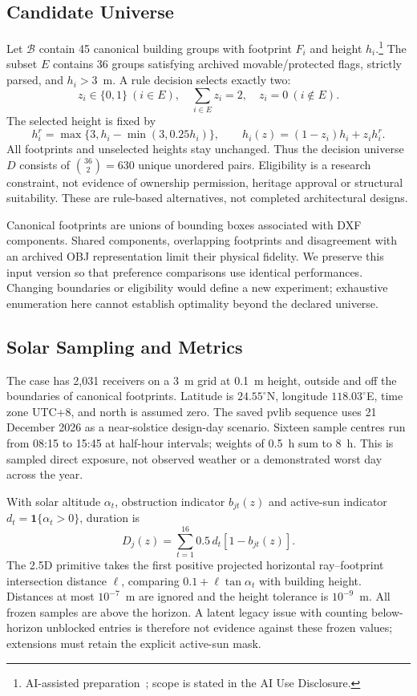 \documentclass{llncs}
\newcommand{\ind}{\mathbf{1}}
\newcommand{\aidraft}{\footnote{AI-assisted preparation~\cite{openai2026}; scope is stated in the AI Use Disclosure.}}
\begin{document}
\subsection{Candidate Universe}
Let $\mathcal B$ contain 45 canonical building groups with footprint $F_i$ and height $h_i$.\aidraft{} The subset $E$ contains 36 groups satisfying archived movable/protected flags, strictly parsed, and $h_i>3$~m. A rule decision selects exactly two:
\begin{equation}
 z_i\in\{0,1\}\ (i\in E),\quad \sum_{i\in E}z_i=2,\quad z_i=0\ (i\notin E).
\label{eq:feasible}
\end{equation}
The selected height is fixed by
\begin{equation}
 h_i^r=\max\{3,h_i-\min(3,0.25h_i)\},\qquad
 h_i(z)=(1-z_i)h_i+z_i h_i^r.
\label{eq:height}
\end{equation}
All footprints and unselected heights stay unchanged. Thus the decision universe $D$ consists of $\binom{36}{2}=630$ unique unordered pairs. Eligibility is a research constraint, not evidence of ownership permission, heritage approval or structural suitability. These are rule-based alternatives, not completed architectural designs.

Canonical footprints are unions of bounding boxes associated with DXF components. Shared components, overlapping footprints and disagreement with an archived OBJ representation limit their physical fidelity. We preserve this input version so that preference comparisons use identical performances. Changing boundaries or eligibility would define a new experiment; exhaustive enumeration here cannot establish optimality beyond the declared universe.

\subsection{Solar Sampling and Metrics}
The case has 2,031 receivers on a 3~m grid at 0.1~m height, outside and off the boundaries of canonical footprints. Latitude is $24.55^\circ$N, longitude $118.03^\circ$E, time zone UTC+8, and north is assumed zero. The saved pvlib sequence uses 21 December 2026 as a near-solstice design-day scenario. Sixteen sample centres run from 08:15 to 15:45 at half-hour intervals; weights of 0.5~h sum to 8~h. This is sampled direct exposure, not observed weather or a demonstrated worst day across the year.

With solar altitude $\alpha_t$, obstruction indicator $b_{jt}(z)$ and active-sun indicator $d_t=\ind\{\alpha_t>0\}$, duration is
\begin{equation}
 D_j(z)=\sum_{t=1}^{16}0.5\,d_t[1-b_{jt}(z)].
\label{eq:duration}
\end{equation}
The 2.5D primitive takes the first positive projected horizontal ray--footprint intersection distance $\ell$, comparing $0.1+\ell\tan\alpha_t$ with building height. Distances at most $10^{-7}$~m are ignored and the height tolerance is $10^{-9}$~m. All frozen samples are above the horizon. A latent legacy issue with counting below-horizon unblocked entries is therefore not evidence against these frozen values; extensions must retain the explicit active-sun mask.
\end{document}
